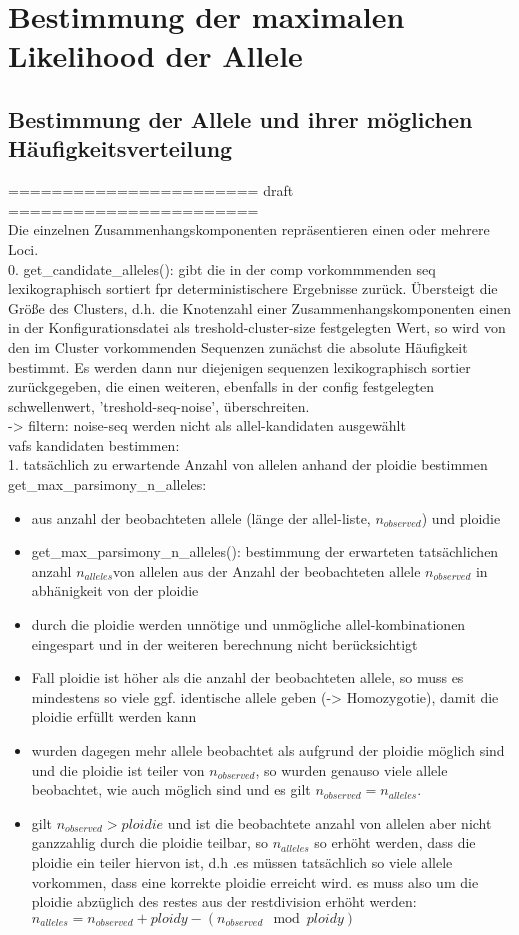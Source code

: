 \section{Bestimmung der maximalen Likelihood der Allele} \label{sec:max_lh_allele}
\subsection{Bestimmung der Allele und ihrer möglichen Häufigkeitsverteilung} \label{subsec:cand_allele}
======================= draft =======================\\
Die einzelnen Zusammenhangskomponenten repräsentieren einen oder mehrere Loci.\\
0. get\_candidate\_alleles(): gibt die in der comp vorkommmenden seq lexikographisch sortiert fpr deterministischere Ergebnisse zurück. Übersteigt die Größe des Clusters, d.h. die Knotenzahl einer Zusammenhangskomponenten einen in der Konfigurationsdatei als treshold-cluster-size festgelegten Wert, so wird von den im Cluster vorkommenden Sequenzen zunächst die absolute Häufigkeit bestimmt. Es werden dann nur diejenigen sequenzen lexikographisch sortier zurückgegeben, die einen weiteren, ebenfalls in der config festgelegten schwellenwert, 'treshold-seq-noise', überschreiten.\\
-> filtern: noise-seq werden nicht als allel-kandidaten ausgewählt \\
vafs kandidaten bestimmen:\\
1. tatsächlich zu erwartende Anzahl von allelen anhand der ploidie bestimmen get\_max\_parsimony\_n\_alleles:
\begin{itemize}
	\item aus anzahl der beobachteten allele (länge der allel-liste, $n_{observed}$) und ploidie
	\item get\_max\_parsimony\_n\_alleles(): bestimmung der erwarteten tatsächlichen anzahl $n_{alleles}$von allelen aus der Anzahl der beobachteten allele $n_{observed}$ in abhänigkeit von der ploidie
	\item durch die ploidie werden unnötige und unmögliche allel-kombinationen   eingespart und in der weiteren berechnung nicht berücksichtigt
	\item Fall ploidie ist höher als die anzahl der beobachteten allele, so muss es mindestens so viele ggf. identische allele geben (-> Homozygotie), damit die ploidie erfüllt werden kann\\
	\item wurden dagegen mehr allele beobachtet als aufgrund der ploidie möglich sind und die ploidie ist teiler von $n_{observed}$, so wurden genauso viele allele beobachtet, wie auch möglich sind und es gilt $n_{observed} = n_{alleles}$. 
	\item gilt $n_{observed}>ploidie$ und ist die beobachtete anzahl von allelen aber nicht ganzzahlig durch die ploidie teilbar, so $n_{alleles}$ so erhöht werden, dass die ploidie ein teiler hiervon ist, d.h .es müssen tatsächlich so viele allele vorkommen, dass eine korrekte ploidie erreicht wird. es muss also um die ploidie abzüglich des restes aus der restdivision erhöht werden: $ n_{alleles} = n_{observed} + ploidy - (n_{observed} \mod ploidy)$
\end{itemize}

